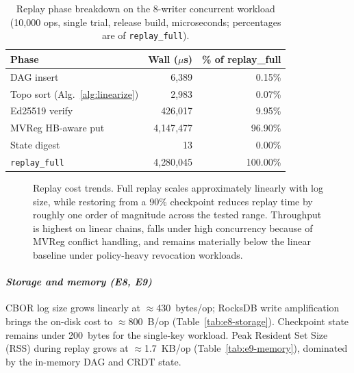 \documentclass[10pt,journal,compsoc]{IEEEtran}
\begin{document}
\begin{table}[!htbp]
\centering
\caption{Replay phase breakdown on the 8-writer concurrent workload (10{,}000 ops, single trial, release build, microseconds; percentages are of \texttt{replay\_full}).}
\label{tab:w4-profile}
\footnotesize
\setlength{\tabcolsep}{6pt}
\renewcommand{\arraystretch}{1.1}
\begin{tabular}{@{}lrr@{}}
\toprule
\textbf{Phase} & \textbf{Wall ($\mu$s)} & \textbf{\% of replay\_full} \\
\midrule
DAG insert                  & 6{,}389       & 0.15\% \\
Topo sort (Alg.~\ref{alg:linearize}) & 2{,}983       & 0.07\% \\
Ed25519 verify              & 426{,}017     & 9.95\% \\
MVReg HB-aware put          & 4{,}147{,}477 & 96.90\% \\
State digest                & 13            & 0.00\% \\
\midrule
\texttt{replay\_full}        & 4{,}280{,}045 & 100.00\% \\
\bottomrule
\end{tabular}
\end{table}

\begin{figure}[!htbp]
\centering

\caption{Replay cost trends. Full replay scales approximately linearly with log size, while restoring from a 90\% checkpoint reduces replay time by roughly one order of magnitude across the tested range. Throughput is highest on linear chains, falls under high concurrency because of MVReg conflict handling, and remains materially below the linear baseline under policy-heavy revocation workloads.}
\label{fig:eval-replay-throughput}
\end{figure}

\paragraph*{\textbf{\textit{Storage and memory (E8, E9)}}}
CBOR log size grows linearly at $\approx$430~bytes/op; RocksDB write amplification brings the on-disk cost to $\approx$800~B/op (Table~\ref{tab:e8-storage}). Checkpoint state remains under 200~bytes for the single-key workload. Peak Resident Set Size (RSS) during replay grows at $\approx$1.7~KB/op (Table~\ref{tab:e9-memory}), dominated by the in-memory DAG and CRDT state.
\end{document}
